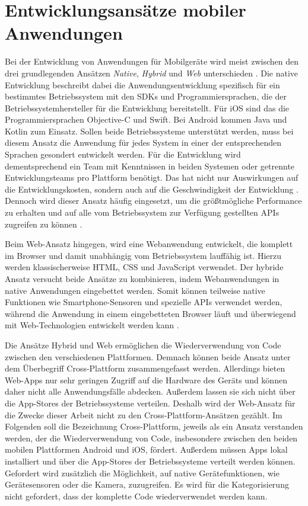 \section{Entwicklungsansätze mobiler Anwendungen}
\label{sec:Entwicklungsansaetze}
Bei der Entwicklung von Anwendungen für Mobilgeräte wird meist zwischen den drei grundlegenden Ansätzen \textit{Native}, \textit{Hybrid} und \textit{Web} unterschieden \cite{Nunkesser_Taxonomy_Apps, Que_Comparison_Hybrid_Native}.
Die native Entwicklung beschreibt dabei die Anwendungsentwicklung spezifisch für ein bestimmtes Betriebssystem mit den \acp{SDK} und Programmiersprachen, die der Betriebssystemhersteller für die Entwicklung bereitstellt.
Für iOS sind das die Programmiersprachen Objective-C und Swift.
Bei Android kommen Java und Kotlin zum Einsatz.
Sollen beide Betriebssysteme unterstützt werden, muss bei diesem Ansatz die Anwendung für jedes System in einer der entsprechenden Sprachen gesondert entwickelt werden.
Für die Entwicklung wird dementsprechend ein Team mit Kenntnissen in beiden Systemen oder getrennte Entwicklungsteams pro Plattform benötigt.
Das hat nicht nur Auswirkungen auf die Entwicklungskosten, sondern auch auf die Geschwindigkeit der Entwicklung \cite{Manchanda_CrossPlatformFrameworks}.
Dennoch wird dieser Ansatz häufig eingesetzt, um die größtmögliche Performance zu erhalten und auf alle vom Betriebssystem zur Verfügung gestellten \acp{API} zugreifen zu können \cite{Pinto_Native_to_Cross_Platform}.

Beim Web-Ansatz hingegen, wird eine Webanwendung entwickelt, die komplett im Browser und damit unabhängig vom Betriebssystem lauffähig ist.
Hierzu werden klassischerweise \ac{HTML}, \ac{CSS} und JavaScript verwendet.
Der hybride Ansatz versucht beide Ansätze zu kombinieren, indem Webanwendungen in native Anwendungen eingebettet werden.
Somit können teilweise native Funktionen wie Smartphone-Sensoren und spezielle \acp{API} verwendet werden, während die Anwendung in einem eingebetteten Browser läuft und überwiegend mit Web-Technologien entwickelt werden kann \cite{Nunkesser_Taxonomy_Apps}.

Die Ansätze Hybrid und Web ermöglichen die Wiederverwendung von Code zwischen den verschiedenen Plattformen.
Demnach können beide Ansatz unter dem Überbegriff Cross-Plattform zusammengefasst werden.
Allerdings bieten Web-Apps nur sehr geringen Zugriff auf die Hardware des Geräts und können daher nicht alle Anwendungsfälle abdecken.
Außerdem lassen sie sich nicht über die App-Stores der Betriebssysteme verteilen.
Deshalb wird der Web-Ansatz für die Zwecke dieser Arbeit nicht zu den Cross-Plattform-Ansätzen gezählt.
Im Folgenden soll die Bezeichnung Cross-Plattform, jeweils als ein Ansatz verstanden werden, der die Wiederverwendung von Code, insbesondere zwischen den beiden mobilen Plattformen Android und iOS, fördert.
Außerdem müssen Apps lokal installiert und über die App-Stores der Betriebssysteme verteilt werden können.
Gefordert wird zusätzlich die Möglichkeit, auf native Gerätefunktionen, wie Gerätesensoren oder die Kamera, zuzugreifen.
Es wird für die Kategorisierung nicht gefordert, dass der komplette Code wiederverwendet werden kann.

